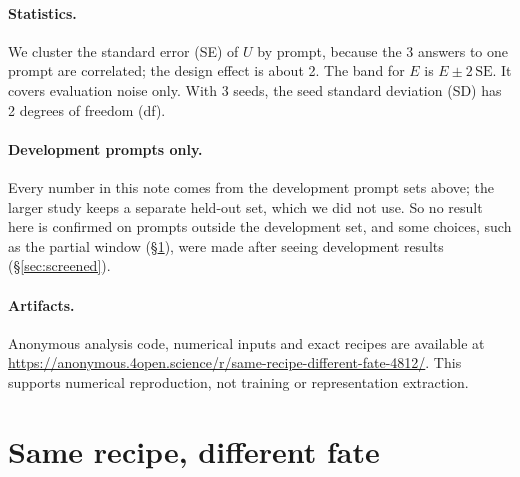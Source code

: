 \documentclass[11pt]{article}
\begin{document}
\paragraph{Statistics.} We cluster the standard error (SE) of $U$ by prompt,
because the 3 answers to one prompt are correlated; the design effect is about
2. The band for $E$ is $E \pm 2\,\mathrm{SE}$. It covers evaluation noise only.
With 3 seeds, the seed standard deviation (SD) has 2 degrees of freedom (df).

\paragraph{Development prompts only.} Every number in this note comes from the
development prompt sets above; the larger study keeps a separate held-out set,
which we did not use. So no result here is confirmed on prompts outside the
development set, and some choices, such as the partial window
(\S\ref{sec:family}), were made after seeing development results
(\S\ref{sec:screened}).

\paragraph{Artifacts.} Anonymous analysis code, numerical inputs and exact
recipes are available at
\url{https://anonymous.4open.science/r/same-recipe-different-fate-4812/}.
This supports numerical reproduction, not training or representation extraction.

\section{Same recipe, different fate}
\label{sec:family}
\end{document}
